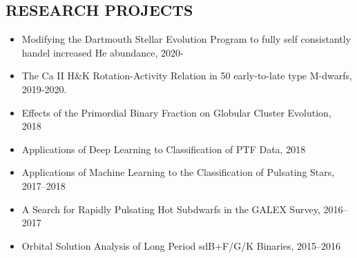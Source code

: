 \documentclass[margin, 10pt]{res} %
\begin{document}
\begin{resume}
\section{RESEARCH PROJECTS}
\begin{itemize}
	\item Modifying the Dartmouth Stellar Evolution Program to fully self consistantly handel increased He abundance, 2020-
	\item The Ca II H\&K Rotation-Activity Relation in 50 early-to-late type M-dwarfs, 2019-2020.
    \item Effects of the Primordial Binary Fraction on Globular Cluster Evolution, 2018
	\item Applications of Deep Learning to Classification of PTF Data, 2018
    \item Applications of Machine Learning to the Classification of Pulsating Stars, 2017--2018
    \item A Search for Rapidly Pulsating Hot Subdwarfs in the GALEX Survey, 2016--2017
    \item Orbital Solution Analysis of Long Period sdB+F/G/K Binaries, 2015--2016
\end{itemize}


\end{resume}
\end{document}

